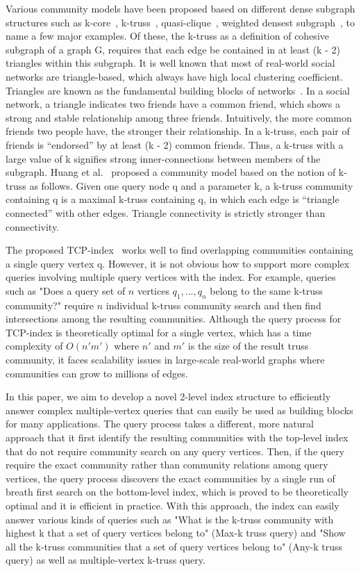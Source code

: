Various community models have been proposed based on different dense subgraph structures such as k-core~\cite{sozio2010community,cui2014local,li2015influential}, k-truss~\cite{huang2014querying}, quasi-clique~\cite{cui2013online}, weighted densest subgraph~\cite{wu2015robust}, to name a few major examples. Of these, the k-truss as a definition of cohesive subgraph of a graph G, requires that each edge be contained in at least (k - 2) triangles within this subgraph. It is well known that most of real-world social networks are triangle-based, which always have high local clustering coefficient. Triangles are known as the fundamental building blocks of networks~\cite{wang2012truss}. In a social network, a triangle indicates two friends have a common friend, which shows a strong and stable relationship among three friends. Intuitively, the more common friends two people have, the stronger their relationship. In a k-truss, each pair of friends is "`endorsed"' by at least (k - 2) common friends. Thus, a k-truss with a large value of k signifies strong inner-connections between members of the subgraph. Huang et al.~\cite{huang2014querying} proposed a community model based on the notion of k-truss as follows. Given one query node q and a parameter k, a k-truss community containing q is a maximal k-truss containing q, in which each edge is "`triangle connected"' with other edges. Triangle connectivity is strictly stronger than connectivity. 

The proposed TCP-index~\cite{huang2014querying} works well to find overlapping communities containing a single query vertex q. However, it is not obvious how to support more complex queries involving multiple query vertices with the index. For example, queries such as "Does a query set of $n$ vertices ${q_1, ..., q_n}$ belong to the same k-truss community?" require $n$ individual k-truss community search and then find intersections among the resulting communities. Although the query process for TCP-index is theoretically optimal for a single vertex, which has a time complexity of $O(n'm')$ where $n'$ and $m'$ is the size of the result truss community, it faces scalability issues in large-scale real-world graphs where communities can grow to millions of edges.

In this paper, we aim to develop a novel 2-level index structure to efficiently answer complex multiple-vertex queries that can easily be used as building blocks for many applications. The query process takes a different, more natural approach that it first identify the resulting communities with the top-level index that do not require community search on any query vertices. Then, if the query require the exact community rather than community relations among query vertices, the query process discovers the exact communities by a single run of breath first search on the bottom-level index, which is proved to be theoretically optimal and it is efficient in practice. With this approach, the index can easily answer various kinds of queries such as "What is the k-truss community with highest k that a set of query vertices belong to" (Max-k truss query) and "Show all the k-truss communities that a set of query vertices belong to" (Any-k truss query) as well as multiple-vertex k-truss query. 

